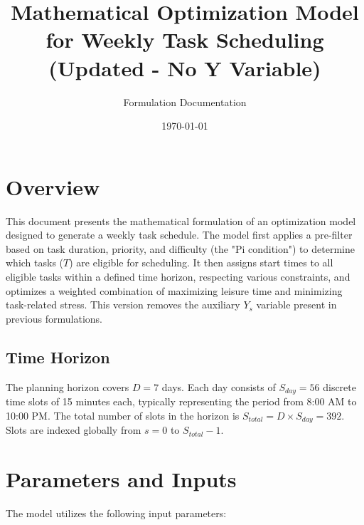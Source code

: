 \documentclass{article}
\title{Mathematical Optimization Model for Weekly Task Scheduling (Updated - No Y Variable)}
\author{Formulation Documentation}
\date{\today}
\begin{document}
\maketitle

\section{Overview}

This document presents the mathematical formulation of an optimization model designed to generate a weekly task schedule. The model first applies a pre-filter based on task duration, priority, and difficulty (the "Pi condition") to determine which tasks ($T$) are eligible for scheduling. It then assigns start times to all eligible tasks within a defined time horizon, respecting various constraints, and optimizes a weighted combination of maximizing leisure time and minimizing task-related stress. This version removes the auxiliary $Y_s$ variable present in previous formulations.

\subsection*{Time Horizon}
The planning horizon covers $D = 7$ days. Each day consists of $S_{day} = 56$ discrete time slots of 15 minutes each, typically representing the period from 8:00 AM to 10:00 PM. The total number of slots in the horizon is $S_{total} = D \times S_{day} = 392$. Slots are indexed globally from $s = 0$ to $S_{total}-1$.

\section{Parameters and Inputs}

The model utilizes the following input parameters:
\end{document}
